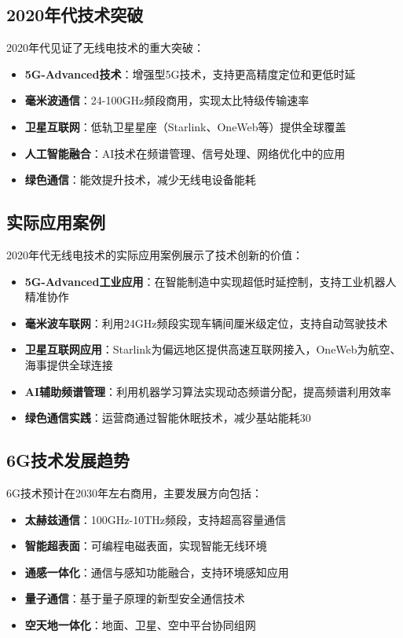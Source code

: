 \documentclass[12pt,UTF8]{ctexbook}
\begin{document}
\subsection{2020年代技术突破}

2020年代见证了无线电技术的重大突破：

\begin{itemize}[leftmargin=3.5em]
    \item \textbf{5G-Advanced技术}：增强型5G技术，支持更高精度定位和更低时延
    \item \textbf{毫米波通信}：24-100GHz频段商用，实现太比特级传输速率
    \item \textbf{卫星互联网}：低轨卫星星座（Starlink、OneWeb等）提供全球覆盖
    \item \textbf{人工智能融合}：AI技术在频谱管理、信号处理、网络优化中的应用
    \item \textbf{绿色通信}：能效提升技术，减少无线电设备能耗
\end{itemize}

\subsection{实际应用案例}

2020年代无线电技术的实际应用案例展示了技术创新的价值：

\begin{itemize}[leftmargin=3.5em]
    \item \textbf{5G-Advanced工业应用}：在智能制造中实现超低时延控制，支持工业机器人精准协作
    \item \textbf{毫米波车联网}：利用24GHz频段实现车辆间厘米级定位，支持自动驾驶技术
    \item \textbf{卫星互联网应用}：Starlink为偏远地区提供高速互联网接入，OneWeb为航空、海事提供全球连接
    \item \textbf{AI辅助频谱管理}：利用机器学习算法实现动态频谱分配，提高频谱利用效率
    \item \textbf{绿色通信实践}：运营商通过智能休眠技术，减少基站能耗30%
\end{itemize}

\subsection{6G技术发展趋势}

6G技术预计在2030年左右商用，主要发展方向包括：

\begin{itemize}[leftmargin=3.5em]
    \item \textbf{太赫兹通信}：100GHz-10THz频段，支持超高容量通信
    \item \textbf{智能超表面}：可编程电磁表面，实现智能无线环境
    \item \textbf{通感一体化}：通信与感知功能融合，支持环境感知应用
    \item \textbf{量子通信}：基于量子原理的新型安全通信技术
    \item \textbf{空天地一体化}：地面、卫星、空中平台协同组网
\end{itemize}
\end{document}
